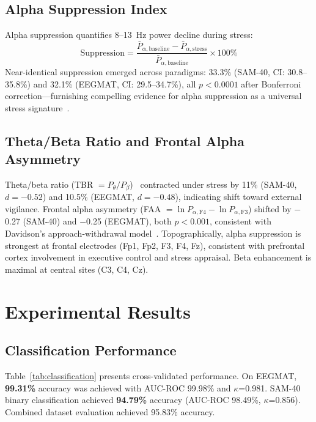 \documentclass[journal,twoside]{IEEEtran}
\begin{document}
\subsection{Alpha Suppression Index}

Alpha suppression quantifies 8--13~Hz power decline during stress:
\begin{equation}
\text{Suppression} = \frac{\bar{P}_{\alpha,\text{baseline}} - \bar{P}_{\alpha,\text{stress}}}{\bar{P}_{\alpha,\text{baseline}}} \times 100\%
\end{equation}
Near-identical suppression emerged across paradigms: 33.3\% (SAM-40, CI: 30.8--35.8\%) and 32.1\% (EEGMAT, CI: 29.5--34.7\%), all $p < 0.0001$ after Bonferroni correction---furnishing compelling evidence for alpha suppression as a universal stress signature~\cite{klimesch1999alpha}.

\subsection{Theta/Beta Ratio and Frontal Alpha Asymmetry}

Theta/beta ratio (TBR $= P_\theta / P_\beta$)~\cite{putman2014eeg} contracted under stress by 11\% (SAM-40, $d=-0.52$) and 10.5\% (EEGMAT, $d=-0.48$), indicating shift toward external vigilance. Frontal alpha asymmetry (FAA $= \ln P_{\alpha,\text{F4}} - \ln P_{\alpha,\text{F3}}$) shifted by $-$0.27 (SAM-40) and $-$0.25 (EEGMAT), both $p<0.001$, consistent with Davidson's approach-withdrawal model~\cite{davidson2004well}. Topographically, alpha suppression is strongest at frontal electrodes (Fp1, Fp2, F3, F4, Fz), consistent with prefrontal cortex involvement in executive control and stress appraisal. Beta enhancement is maximal at central sites (C3, C4, Cz).

\section{Experimental Results}

\subsection{Classification Performance}

Table~\ref{tab:classification} presents cross-validated performance. On EEGMAT, \textbf{99.31\%} accuracy was achieved with AUC-ROC 99.98\% and $\kappa$=0.981. SAM-40 binary classification achieved \textbf{94.79\%} accuracy (AUC-ROC 98.49\%, $\kappa$=0.856). Combined dataset evaluation achieved 95.83\% accuracy.
\end{document}

